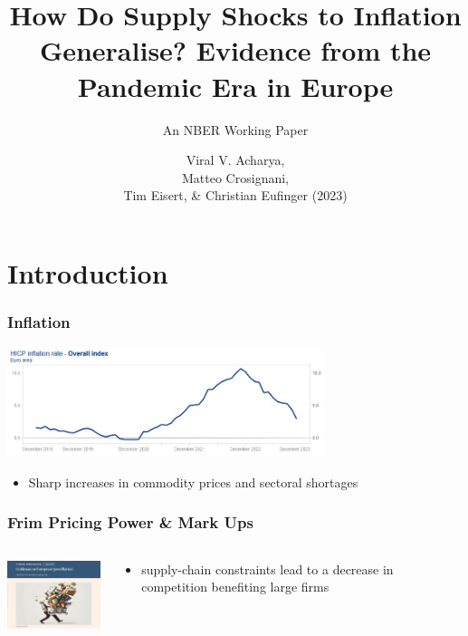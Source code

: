 \documentclass{beamer}
\title{ How Do Supply Shocks to Inflation Generalise? Evidence from the Pandemic Era in Europe}
\subtitle{An NBER Working Paper}
\author{Viral V. Acharya,\\ Matteo Crosignani,\\ Tim Eisert, \& Christian Eufinger (2023)}
\begin{document}
	\begin{frame}[plain]
		\maketitle
	\end{frame}
\begin{spacing}{1.5}
	
\begin{frame}
	\tableofcontents
\end{frame}
	
\section{Introduction}
	\begin{frame}
	\frametitle{Inflation}
		\begin{center}
			\includegraphics[width= 25em]{inflation}
		\end{center}
		\cite{blanchard2023caused}
		\begin{itemize}
			\item Sharp increases in commodity prices and sectoral shortages
		\end{itemize}
	\end{frame}
	
	\begin{frame}
		\frametitle{Frim Pricing Power \& Mark Ups}
		\begin{columns}
			\begin{column}{0.3\textwidth}
				\includegraphics[width=10em]{greedflation}
			\end{column}
			
			\begin{column}{0.6\textwidth}
				\cite{franzoni2023supply}
				\begin{itemize}
					\item supply-chain constraints lead to a decrease in competition benefiting large firms
				\end{itemize}
				

\end{column}
\end{columns}
\end{frame}
\end{spacing}
\end{document}
